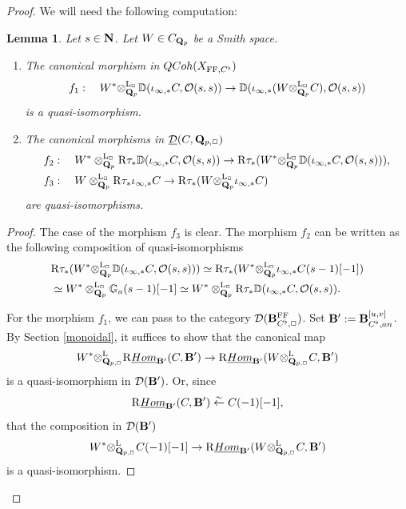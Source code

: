 \documentclass[10pt,reqno]{amsart}
\newcommand{\wiesia}[1]{\textcolor{red}{[Wiesia: #1]}}
\newtheorem{lemma}[equation]{Lemma}
\theoremstyle{definition}
\theoremstyle{remark}
\newcommand{\uHom}{\underline{{\rm{Hom}} }}
\newcommand{\LL}{\operatorname{L} }
\newcommand{\FF}{\operatorname{FF} }
\newcommand{\so}{{\mathcal O}}
\newcommand{\sd}{{\mathcal{D}}}
\numberwithin{equation}{section}
\def\R{{\mathrm R}}
\def\Q{{\bf Q}} \def\Z{{\bf Z}}
\def\N{{\bf N}}
\numberwithin{equation}{section}
\begin{document}
\begin{proof}
  We will need the following computation: 
  \begin{lemma} \label{frank2} Let $s\in\N$. Let $W\in C_{\Q_p}$ be  a Smith space. 
  \begin{enumerate}
  \item   The canonical morphism in ${\rm QCoh}(X_{\FF,C^{\flat}})$
      \begin{equation}\label{comp1}
   f_1:\quad W^*{\otimes^{\LL_{\Box}}_{\Q_{p}}}{\mathbb D}(\iota_{\infty,*}C,\so(s,s))\to  {\mathbb D}(\iota_{\infty,*}(W{\otimes^{\LL_{\Box}}_{\Q_{p}}}C),\so(s,s)) 
\end{equation}
is a quasi-isomorphism. 
\item  The canonical morphisms in $\underline{\sd}(C,\Q_{p,\Box})$
\begin{align*}
 & f_2:\quad W^*\otimes^{\LL_{\Box}}_{\Q_{p}} \R\tau_*{\mathbb D}(\iota_{\infty,*}C,\so(s,s))\to \R\tau_*(W^*{\otimes^{\LL_{\Box}}_{\Q_{p}}}{\mathbb D}(\iota_{\infty,*}C,\so(s,s))),\\
& f_3:\quad  W\otimes^{\LL_{\Box}}_{\Q_{p}}\R\tau_*\iota_{\infty,*}C\to \R\tau_*(W{\otimes^{\LL_{\Box}}_{\Q_{p}}}\iota_{\infty, *}C)
\end{align*}
are  quasi-isomorphisms.
\end{enumerate}
\end{lemma}
\begin{proof} The case of the morphism $f_3$ is clear.  The morphism $f_2$ can be written as the following composition of quasi-isomorphisms
  \begin{align*}
   &  \R\tau_{*} (W^*{\otimes^{\LL_{\Box}}_{\Q_{p}}}{\mathbb D}(\iota_{\infty,*}C,\so(s,s)))
  \simeq  \R\tau_{*} (W^*{\otimes^{\LL_{\Box}}_{\Q_{p}}}\iota_{\infty,*}C(s-1)[-1])\\
&\simeq  W^*\otimes^{\LL_{\Box}}_{\Q_{p}}{\mathbb G}_a(s-1)[-1]\simeq  W^*\otimes^{\LL_{\Box}}_{\Q_{p}}\R\tau_*{\mathbb D}(\iota_{\infty,*}C,\so(s,s)).
\end{align*}


 For the morphism $f_1$, 
  we can pass to the category $\sd(\B^{\FF}_{C^{\flat},\Box})$. Set 
$\B^{\prime}:=\B^{[u,v]}_{C^{\flat},{\rm an}}$. By Section \ref{monoidal},  it  suffices  to show that the canonical map 
  $$
    W^*{\otimes^{\LL}_{\Q_{p,\Box}}}\R\uHom_{\B^{\prime}}(C,\B^{\prime})\to   \R\uHom_{\B^{\prime}}(W{\otimes^{\LL}_{\Q_{p,\Box}}}C,\B^{\prime}) 
$$
is a quasi-isomorphism in $\sd(\B^{\prime})$.
Or, since 
\begin{equation}\label{kolo242}
\R\uHom_{\B^{\prime}}(C,\B^{\prime})\stackrel{\sim}{\leftarrow} C(-1)[-1],
\end{equation}
 that the composition in $\sd(\B^{\prime})$ 
\begin{equation}\label{kolo240}
W^*{\otimes^{\LL}_{\Q_{p,\Box}}}C(-1)[-1]\to   \R\uHom_{\B^{\prime}}(W{\otimes^{\LL}_{\Q_{p,\Box}}}C,\B^{\prime})
\end{equation}
is a quasi-isomorphism.
  

\end{proof}
\end{proof}
\end{document}
